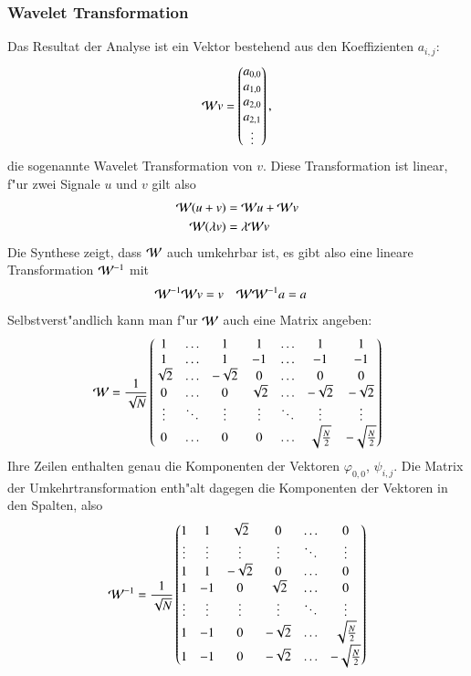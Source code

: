 \subsubsection{Wavelet Transformation}
Das Resultat der Analyse ist ein Vektor bestehend aus den Koeffizienten
$a_{i,j}$:
$$
{\cal W}v=\begin{pmatrix}a_{0,0}\\a_{1,0}\\a_{2,0}\\a_{2,1}\\\vdots\end{pmatrix},
$$
die sogenannte Wavelet Transformation von $v$.
Diese Transformation ist linear, f"ur zwei Signale $u$ und $v$ gilt also
\begin{align*}
{\cal W}(u+v)&={\cal W}u+{\cal W}v\\
{\cal W}(\lambda v)&=\lambda{\cal W}v
\end{align*}
Die Synthese zeigt, dass ${\cal W}$ auch umkehrbar ist, es gibt also
eine lineare Transformation ${\cal W}^{-1}$ mit
\begin{align*}
{\cal W}^{-1}{\cal W}v&=v
&
{\cal W}{\cal W}^{-1}a&=a
\end{align*}
Selbstverst"andlich kann man f"ur $\cal W$ auch eine Matrix angeben:
$$
{\cal W}
=
\frac1{\sqrt{N}}
\begin{pmatrix}
1&\dots&1&1&\dots&1&1\\
1&\dots&1&-1&\dots&-1&-1\\
\sqrt{2}&\dots&-\sqrt{2}&0&\dots&0&0\\
0&\dots&0&\sqrt{2}&\dots&-\sqrt{2}&-\sqrt{2}\\
\vdots&\ddots&\vdots&\vdots&\ddots&\vdots&\vdots\\
0&\dots&0&0&\dots&\sqrt{\frac{N}2}&-\sqrt{\frac{N}2}
\end{pmatrix}
$$
Ihre Zeilen enthalten genau die Komponenten der Vektoren
$\varphi_{0,0}$, $\psi_{i,j}$.
Die Matrix der Umkehrtransformation enth"alt dagegen die
Komponenten der Vektoren in den Spalten, also
$$
{\cal W}^{-1}
=
\frac1{\sqrt{N}}
\begin{pmatrix}
1&1&\sqrt{2}&0&\dots&0\\
\vdots&\vdots&\vdots&\vdots&\ddots&\vdots\\
1&1&-\sqrt{2}&0&\dots&0\\
1&-1&0&\sqrt{2}&\dots&0\\
\vdots&\vdots&\vdots&\vdots&\ddots&\vdots\\
1&-1&0&-\sqrt{2}&\dots&\sqrt{\frac{N}2}\\
1&-1&0&-\sqrt{2}&\dots&-\sqrt{\frac{N}2}
\end{pmatrix}
$$

